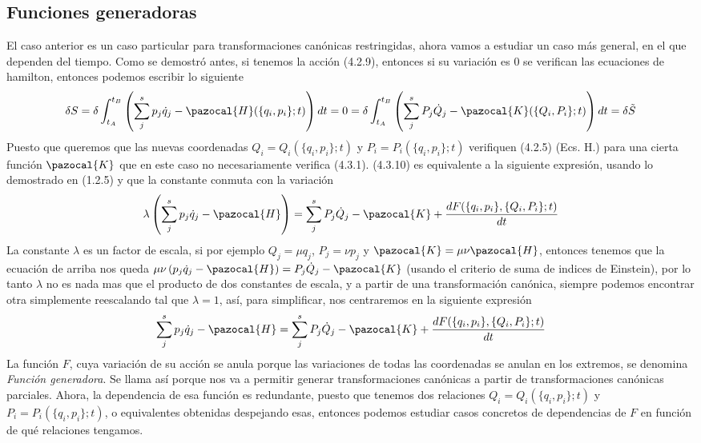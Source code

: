 \subsection{Funciones generadoras}
El caso anterior es un caso particular para transformaciones canónicas restringidas, ahora vamos a estudiar un caso más general, en el que dependen del tiempo. Como se demostró antes, si tenemos la acción (4.2.9), entonces si su variación es $0$ se verifican las ecuaciones de hamilton, entonces podemos escribir lo siguiente
\begin{equation} \label{4.2.7}
    \delta S = \delta\int_{t_A}^{t_B} \left(\sum_j^s p_j \dot{q}_j -\pazocal{H}(\{q_i,p_i\};t)\right) dt = 0 = \delta\int_{t_A}^{t_B} \left(\sum_j^s P_j \dot{Q}_j -\pazocal{K}(\{Q_i,P_i\};t)\right) dt = \delta \tilde{S}
\end{equation} 
Puesto que queremos que las nuevas coordenadas $Q_i=Q_i(\{q_i,p_i\};t)$ y $P_i=P_i(\{q_i,p_i\};t)$ verifiquen (4.2.5) (Ecs. H.) para una cierta función $\pazocal{K}$ que en este caso no necesariamente verifica (4.3.1). (4.3.10) es equivalente a la siguiente expresión, usando lo demostrado en (1.2.5) y que la constante conmuta con la variación
\begin{equation} \label{4.2.7}
    \lambda\left(\sum_j^s p_j \dot{q}_j -\pazocal{H}\right) = \sum_j^s P_j \dot{Q}_j -\pazocal{K} +  \frac{dF(\{q_i,p_i\},\{Q_i,P_i\};t)}{dt}
\end{equation} 
La constante $\lambda$ es un factor de escala, si por ejemplo $Q_j = \mu q_j$, $P_j = \nu p_j$ y $\pazocal{K} = \mu \nu \pazocal{H}$, entonces tenemos que la ecuación de arriba nos queda $\mu\nu\left(p_j \dot{q}_j -\pazocal{H}\right) = P_j \dot{Q}_j -\pazocal{K}$ (usando el criterio de suma de indices de Einstein), por lo tanto $\lambda$ no es nada mas que el producto de dos constantes de escala, y a partir de una transformación canónica, siempre podemos encontrar otra simplemente reescalando tal que $\lambda = 1$, así, para simplificar, nos centraremos en la siguiente expresión 
\begin{equation} \label{4.2.7}
    \sum_j^s p_j \dot{q}_j -\pazocal{H} = \sum_j^s P_j \dot{Q}_j -\pazocal{K} + \frac{dF(\{q_i,p_i\},\{Q_i,P_i\};t)}{dt}
\end{equation} 
La función $F$, cuya variación de su acción se anula porque las variaciones de todas las coordenadas se anulan en los extremos, se denomina \textit{Función generadora}. Se llama así porque nos va a permitir generar transformaciones canónicas a partir de transformaciones canónicas parciales.
\newpage
Ahora, la dependencia de esa función es redundante, puesto que tenemos dos relaciones $Q_i=Q_i(\{q_i,p_i\};t)$ y $P_i=P_i(\{q_i,p_i\};t)$, o equivalentes obtenidas despejando esas, entonces podemos estudiar casos concretos de dependencias de $F$ en función de qué relaciones tengamos.

